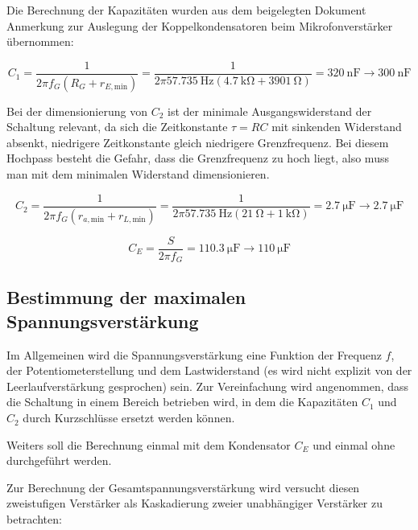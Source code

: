Die Berechnung der Kapazitäten wurden aus dem beigelegten Dokument \glqq Anmerkung zur Auslegung der Koppelkondensatoren beim Mikrofonverstärker\grqq{} übernommen:

\begin{equation*}
    C_1 = \frac{1}{2 \pi f_G \left( R_G + r_{E,\text{min}} \right)} = \frac{1}{2 \pi \SI{57.735}{\hertz} \left(\SI{4.7}{\kilo \ohm} +  \SI{3901}{\ohm}\right)} = \SI{320}{\nano \farad} \rightarrow \SI{300}{\nano \farad}
\end{equation*}

Bei der dimensionierung von $C_2$ ist der minimale Ausgangswiderstand der Schaltung relevant, da sich die Zeitkonstante $\tau = RC$ mit sinkenden Widerstand absenkt, niedrigere Zeitkonstante gleich niedrigere Grenzfrequenz. Bei diesem Hochpass besteht die Gefahr, dass die Grenzfrequenz zu hoch liegt, also muss man mit dem minimalen Widerstand dimensionieren.

\begin{equation*}
    C_2 = \frac{1}{2 \pi f_G \left( r_{a,\text{min}} + r_{L,\text{min}} \right)} = \frac{1}{2 \pi \SI{57.735}{\hertz} \left(\SI{21}{\ohm} +  \SI{1}{\kilo \ohm}\right)} = \SI{2.7}{\micro \farad} \rightarrow \SI{2.7}{\micro \farad}
\end{equation*}

\begin{equation*}
    C_E = \frac{S}{2 \pi f_G} = \SI{110.3}{\micro \farad} \rightarrow \SI{110}{\micro \farad}
\end{equation*}

\subsection{Bestimmung der maximalen Spannungsverstärkung}

Im Allgemeinen wird die Spannungsverstärkung eine Funktion der Frequenz $f$, der Potentiometerstellung und dem Lastwiderstand (es wird nicht explizit von der Leerlaufverstärkung gesprochen) sein.
Zur Vereinfachung wird angenommen, dass die Schaltung in einem Bereich betrieben wird, in dem die Kapazitäten $C_1$ und $C_2$ durch Kurzschlüsse ersetzt werden können.

Weiters soll die Berechnung einmal mit dem Kondensator $C_E$ und einmal ohne durchgeführt werden.

Zur Berechnung der Gesamtspannungsverstärkung wird versucht diesen zweistufigen Verstärker als Kaskadierung zweier unabhängiger Verstärker zu betrachten: 

